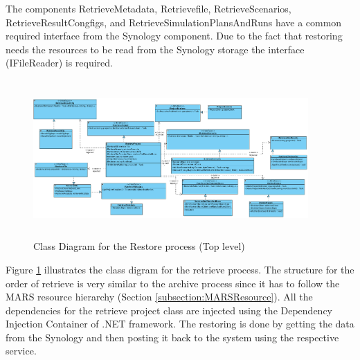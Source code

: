 The components RetrieveMetadata, Retrievefile, RetrieveScenarios, RetrieveResultCongfigs, and RetrieveSimulationPlansAndRuns have a common required interface
from the Synology component. Due to the fact that restoring needs the resources to be read from the Synology storage the interface (IFileReader) is required. 

\begin{figure}[H]
    \centering \includegraphics[height=6cm, angle=90, origin=c, width=10.5cm]{grafiken/restoreClass.png}
    \caption{Class Diagram for the Restore process (Top level)}
    \label{fig:restoreClass}
\end{figure}


Figure \ref{fig:restoreClass} illustrates the class digram for the retrieve process. The structure for the order of retrieve is very similar to the archive process
since it has to follow the MARS resource hierarchy (Section \ref{subsection:MARSResource}). All the dependencies for the retrieve project class are injected
using the Dependency Injection Container of .NET framework. The restoring is done by getting the data from the Synology and then posting it back to the system
using the respective service.


